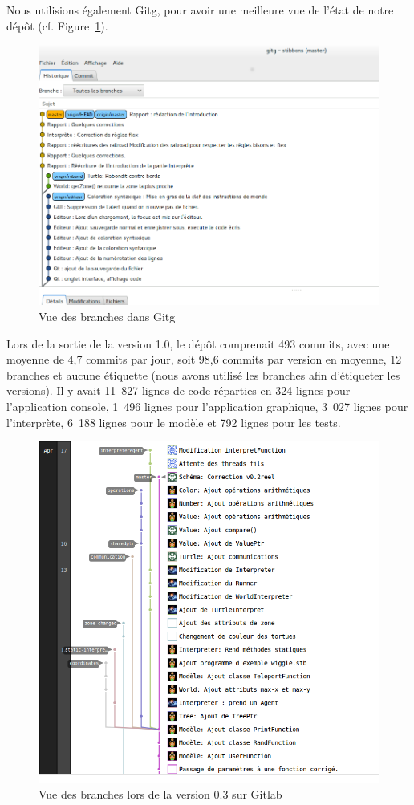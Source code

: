 Nous utilisions également Gitg, pour avoir une meilleure vue de l'état de notre dépôt (cf. Figure~\ref{Gitg}).

\begin{figure}[h]
\centering
\includegraphics[scale=0.35]{doc/gestionProjet/gitbranche.png}
\caption{\label{Gitg} Vue des branches dans Gitg}
\end{figure}

Lors de la sortie de la version 1.0, le dépôt comprenait 493 commits, avec une moyenne de 4,7 commits par jour, soit 98,6 commits par version en moyenne, 12 branches et aucune étiquette (nous avons utilisé les branches afin d'étiqueter les versions).
Il y avait 11~827 lignes de code réparties en 324 lignes pour l'application console, 1~496 lignes pour l'application graphique, 3~027 lignes pour l'interprète, 6~188 lignes pour le modèle et 792 lignes pour les tests.

\begin{figure}[h]
\centering
\includegraphics[scale=0.35]{doc/report/uml/network-v3.png}
\caption{\label{branche} Vue des branches lors de la version 0.3 sur Gitlab}
\end{figure}

